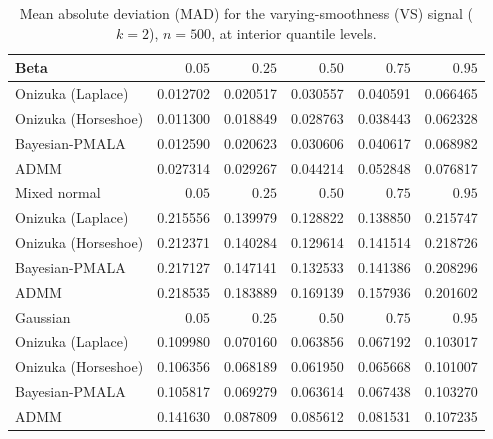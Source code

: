 \begin{table}[!htbp]
\centering
\small
\caption{Mean absolute deviation (MAD) for the varying-smoothness (VS) signal ($k=2$), $n=500$, at interior quantile levels.}
\label{tab:vs_int_mad}
\begin{tabular}{lrrrrr}
\toprule
Beta & $0.05$ & $0.25$ & $0.50$ & $0.75$ & $0.95$ \\
\midrule
Onizuka (Laplace) & 0.012702 & 0.020517 & 0.030557 & 0.040591 & 0.066465 \\
Onizuka (Horseshoe) & 0.011300 & 0.018849 & 0.028763 & 0.038443 & 0.062328 \\
Bayesian-PMALA & 0.012590 & 0.020623 & 0.030606 & 0.040617 & 0.068982 \\
ADMM & 0.027314 & 0.029267 & 0.044214 & 0.052848 & 0.076817 \\
\midrule
Mixed normal & $0.05$ & $0.25$ & $0.50$ & $0.75$ & $0.95$ \\
\midrule
Onizuka (Laplace) & 0.215556 & 0.139979 & 0.128822 & 0.138850 & 0.215747 \\
Onizuka (Horseshoe) & 0.212371 & 0.140284 & 0.129614 & 0.141514 & 0.218726 \\
Bayesian-PMALA & 0.217127 & 0.147141 & 0.132533 & 0.141386 & 0.208296 \\
ADMM & 0.218535 & 0.183889 & 0.169139 & 0.157936 & 0.201602 \\
\midrule
Gaussian & $0.05$ & $0.25$ & $0.50$ & $0.75$ & $0.95$ \\
\midrule
Onizuka (Laplace) & 0.109980 & 0.070160 & 0.063856 & 0.067192 & 0.103017 \\
Onizuka (Horseshoe) & 0.106356 & 0.068189 & 0.061950 & 0.065668 & 0.101007 \\
Bayesian-PMALA & 0.105817 & 0.069279 & 0.063614 & 0.067438 & 0.103270 \\
ADMM & 0.141630 & 0.087809 & 0.085612 & 0.081531 & 0.107235 \\
\bottomrule
\end{tabular}
\end{table}
